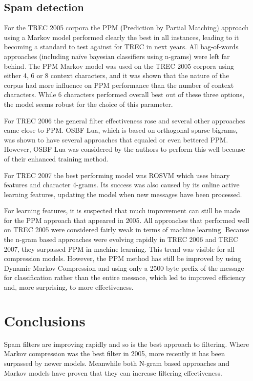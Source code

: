 \documentclass[runningheads,a4paper]{llncs}
\begin{document}
\subsection{Spam detection}
For the TREC 2005 corpora the PPM\cite{2005markovcharacter} (Prediction by Partial Matching) approach 
using a Markov model performed clearly the best in all instances\cite{2007systematic}, leading to it becoming a standard to 
test against for TREC in next years. All bag-of-words approaches (including na\"ive bayesian classifiers using n-grams) were
left far behind. The PPM Markov model was used on the TREC 2005 corpora using either 4, 6 or 8 context characters, and it 
was shown that the nature of the corpus had more influence on PPM performance than the number of context characters. While
6 characters performed overall best out of these three options, the model seems robust for the choice of this parameter\cite{2005markovcharacter}.

For TREC 2006 the general filter effectiveness rose and several other approaches came 
close to PPM. OSBF-Lua\cite{2006osbflua}, which is based on orthogonal sparse bigrams, 
was shown to have several approaches that equaled or even bettered PPM\cite{2007systematic}.
However, OSBF-Lua was considered by the authors to perform this well because of their
enhanced training method.

For TREC 2007 the best performing model was ROSVM\cite{2007rosvm} which uses binary
features and character 4-grams. Its success was also caused by its online active 
learning features, updating the model when new messages have been processed.

For learning features, it is suspected that much improvement can still be made for
the PPM approach that appeared in 2005. All approaches that performed well on TREC
2005 were considered fairly weak in terms of machine learning\cite{2007systematic}.
Because the n-gram based approaches were evolving rapidly in TREC 2006 and TREC 2007,
they surpassed PPM in machine learning. This trend was visible for all compression
models\cite{2007overview}. However, the PPM method has still be improved by using
Dynamic Markov Compression and using only a 2500 byte prefix of the message for
classification rather than the entire messace, which led to improved efficiency and, 
more surprising, to more effectiveness\cite{2007systematic}.

\section{Conclusions}
Spam filters are improving rapidly and so is the best approach to filtering. Where 
Markov compression was the best filter in 2005, more recently it has been surpassed 
by newer models. Meanwhile both N-gram based approaches and Markov models have proven
that they can increase filtering effectiveness. 
\end{document}
